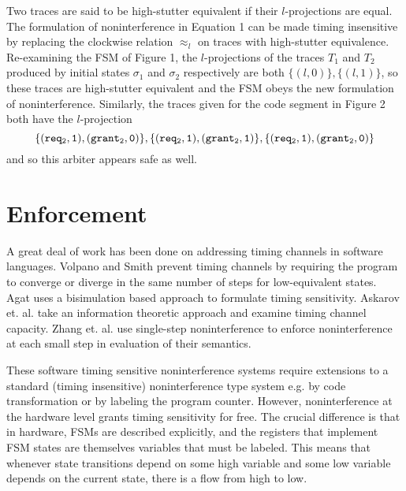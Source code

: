 \documentclass[paper=a4, fontsize=10pt]{scrartcl} %
\begin{document}
Two traces are said to be high-stutter equivalent if their $l$-projections are 
equal. The formulation of noninterference in Equation 1 
can be made timing insensitive by replacing the clockwise relation 
$\approx_l$ on traces with high-stutter equivalence. Re-examining the FSM of 
Figure 1, the $l$-projections of the traces $T_1$ and $T_2$ produced by initial 
states $\sigma_1$ and $\sigma_2$ respectively are both $\{(l,0)\}, \{(l,1)\}$, so 
these traces are high-stutter equivalent and the FSM obeys the new formulation 
of noninterference. Similarly, the traces given for the code segment in Figure 
2 both have the $l$-projection
$$
\tt
\{(req_2,1),(grant_2,0)\}, \{(req_2,1),(grant_2,1)\}, 
\{(req_2,1),(grant_2,0)\}
$$
and so this arbiter appears safe as well.

\section{Enforcement}
A great deal of work has been done on addressing timing channels in software 
languages. Volpano and Smith prevent timing channels by requiring the program 
to converge or diverge in the same number of steps for low-equivalent states. 
Agat uses a bisimulation based approach to formulate timing sensitivity. 
Askarov et. al. take an information theoretic approach and examine timing 
channel capacity. Zhang et. al. use single-step noninterference to enforce 
noninterference at each small step in evaluation of their semantics. 

These software timing sensitive noninterference systems require extensions to a 
standard (timing insensitive) noninterference type system e.g. by code 
transformation or by labeling the program counter. However, noninterference at 
the hardware level grants timing sensitivity for free. The crucial difference 
is that in hardware, FSMs are described explicitly, and the registers that 
implement FSM states are themselves variables that must be labeled. This means 
that whenever state transitions depend on some high variable and some low 
variable depends on the current state, there is a flow from high to low.
\end{document}

